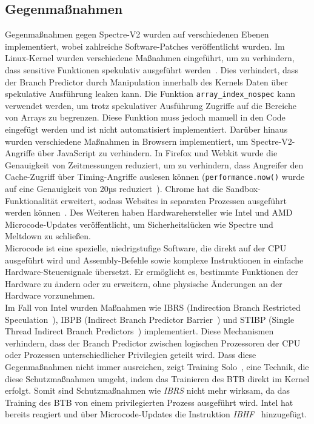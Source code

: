 \subsection{Gegenmaßnahmen}
\label{subsec:spectre_gegenmassnahmen}
Gegenmaßnahmen gegen Spectre-V2 wurden auf verschiedenen Ebenen implementiert, wobei zahlreiche Software-Patches veröffentlicht wurden.
Im Linux-Kernel wurden verschiedene Maßnahmen eingeführt, um zu verhindern, dass sensitive Funktionen spekulativ ausgeführt werden~\cite{linux_nospec}.
Dies verhindert, dass der Branch Predictor durch Manipulation innerhalb des Kernels Daten über spekulative Ausführung leaken kann.
Die Funktion \texttt{array\_index\_nospec} kann verwendet werden, um trotz spekulativer Ausführung Zugriffe auf die Bereiche von Arrays zu begrenzen.
Diese Funktion muss jedoch manuell in den Code eingefügt werden und ist nicht automatisiert implementiert.
Darüber hinaus wurden verschiedene Maßnahmen in Browsern implementiert, um Spectre-V2-Angriffe über JavaScript zu verhindern.
In Firefox und Webkit wurde die Genauigkeit von Zeitmessungen reduziert, um zu verhindern, dass Angreifer den Cache-Zugriff über Timing-Angriffe auslesen können (\texttt{performance.now()} wurde auf eine Genauigkeit von 20µs reduziert~\cite{luke_wagner_2018}).
Chrome hat die Sandbox-Funktionalität erweitert, sodass Websites in separaten Prozessen ausgeführt werden können~\cite{heise_2018_spec}.
Des Weiteren haben Hardwarehersteller wie Intel und AMD Microcode-Updates veröffentlicht, um Sicherheitslücken wie Spectre und Meltdown zu schließen. \\
Microcode ist eine spezielle, niedrigstufige Software, die direkt auf der CPU ausgeführt wird und Assembly-Befehle sowie komplexe Instruktionen in einfache Hardware-Steuersignale übersetzt.
Er ermöglicht es, bestimmte Funktionen der Hardware zu ändern oder zu erweitern, ohne physische Änderungen an der Hardware vorzunehmen. \\
Im Fall von Intel wurden Maßnahmen wie IBRS (Indirection Branch Restricted Speculation~\cite{intel_1}), IBPB (Indirect Branch Predictor Barrier~\cite{intel_2}) und STIBP (Single Thread Indirect Branch Predictors~\cite{intel_3}) implementiert.
Diese Mechanismen verhindern, dass der Branch Predictor zwischen logischen Prozessoren der CPU oder Prozessen unterschiedlicher Privilegien geteilt wird.
Dass diese Gegenmaßnahmen nicht immer ausreichen, zeigt Training Solo~\cite{training_solo}, eine Technik, die diese Schutzmaßnahmen umgeht, indem das Trainieren des BTB direkt im Kernel erfolgt.
Somit sind Schutzmaßnahmen wie \textit{IBRS} nicht mehr wirksam, da das Training des BTB von einem privilegierten Prozess ausgeführt wird.
Intel hat bereits reagiert und über Microcode-Updates die Instruktion \textit{IBHF}~\cite{darkcrizt_2025} hinzugefügt.